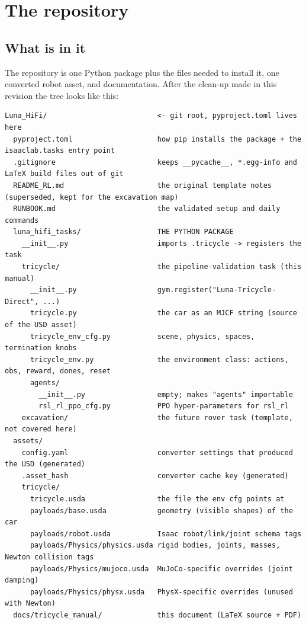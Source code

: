 \chapter{The repository}
\label{ch:repo}

\section{What is in it}

The repository is one Python package plus the files needed to install it,
one converted robot asset, and documentation. After the clean-up made in this
revision the tree looks like this:

\begin{lstlisting}[style=plain,numbers=none]
Luna_HiFi/                          <- git root, pyproject.toml lives here
  pyproject.toml                    how pip installs the package + the isaaclab.tasks entry point
  .gitignore                        keeps __pycache__, *.egg-info and LaTeX build files out of git
  README_RL.md                      the original template notes (superseded, kept for the excavation map)
  RUNBOOK.md                        the validated setup and daily commands
  luna_hifi_tasks/                  THE PYTHON PACKAGE
    __init__.py                     imports .tricycle -> registers the task
    tricycle/                       the pipeline-validation task (this manual)
      __init__.py                   gym.register("Luna-Tricycle-Direct", ...)
      tricycle.py                   the car as an MJCF string (source of the USD asset)
      tricycle_env_cfg.py           scene, physics, spaces, termination knobs
      tricycle_env.py               the environment class: actions, obs, reward, dones, reset
      agents/
        __init__.py                 empty; makes "agents" importable
        rsl_rl_ppo_cfg.py           PPO hyper-parameters for rsl_rl
    excavation/                     the future rover task (template, not covered here)
  assets/
    config.yaml                     converter settings that produced the USD (generated)
    .asset_hash                     converter cache key (generated)
    tricycle/
      tricycle.usda                 the file the env cfg points at
      payloads/base.usda            geometry (visible shapes) of the car
      payloads/robot.usda           Isaac robot/link/joint schema tags
      payloads/Physics/physics.usda rigid bodies, joints, masses, Newton collision tags
      payloads/Physics/mujoco.usda  MuJoCo-specific overrides (joint damping)
      payloads/Physics/physx.usda   PhysX-specific overrides (unused with Newton)
  docs/tricycle_manual/             this document (LaTeX source + PDF)
\end{lstlisting}

